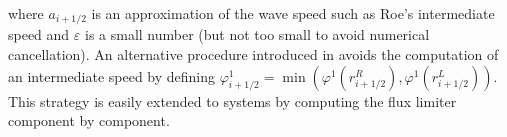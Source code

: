 where $a_{i+1/2}$ is an approximation of the wave speed such as Roe's intermediate speed and 
$\varepsilon$ is a small number (but not too small to avoid numerical cancellation). 
An alternative procedure introduced in \cite{Toro2009} avoids the computation of an intermediate speed by defining $\varphi^1_{i+1/2}=\min( \varphi^1(r_{i+1/2}^R), \varphi^1(r_{i+1/2}^L))$.
This strategy is easily extended to systems by computing the flux limiter component by component.



